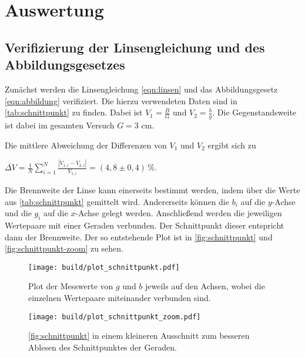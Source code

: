 \section{Auswertung}
\label{sec:Auswertung}

\subsection{Verifizierung der Linsengleichung und des Abbildungsgesetzes}

Zunächst werden die Linsengleichung \eqref{eqn:linsen} und das Abbildungsgesetz \eqref{eqn:abbildung} verifiziert.
Die hierzu verwendeten Daten sind in \autoref{tab:schnittpunkt} zu finden.
Dabei ist $V_1 = \frac{B}{G}$ und $V_2 = \frac{b}{g}$. Die Gegenstandsweite ist dabei im gesamten Versuch $G = 3$ cm.



Die mittlere Abweichung der Differenzen von $V_1$ und $V_2$ ergibt sich zu

\begin{center}
    $\overline{\Delta V} = \frac{1}{N} \sum^N_{i=1} \frac{| V_{1,i} - V_{2,i} |}{V_{1,i}} = (4,8 \pm 0,4) \, \%$.
\end{center}

Die Brennweite der Linse kann einerseits bestimmt werden, indem über die Werte aus \autoref{tab:schnittpunkt} gemittelt wird.
Andererseits können die $b_i$ auf die $y$-Achse und die $g_i$ auf die $x$-Achse gelegt werden. Anschließend werden die jeweiligen Wertepaare mit einer Geraden verbunden.
Der Schnittpunkt dieser entspricht dann der Brennweite.
Der so entstehende Plot ist in \autoref{fig:schnittpunkt} und \autoref{fig:schnittpunkt-zoom} zu sehen.

\begin{figure}
  \centering
  \texttt{[image: build/plot\_schnittpunkt.pdf]}
  \caption{Plot der Messwerte von $g$ und $b$ jeweils auf den Achsen, wobei die einzelnen Wertepaare miteinander verbunden sind.}
  \label{fig:schnittpunkt}
\end{figure}

\begin{figure}
  \centering
  \texttt{[image: build/plot\_schnittpunkt\_zoom.pdf]}
  \caption{\autoref{fig:schnittpunkt} in einem kleineren Ausschnitt zum besseren Ablesen des Schnittpunktes der Geraden.}
  \label{fig:schnittpunkt-zoom}
\end{figure}


